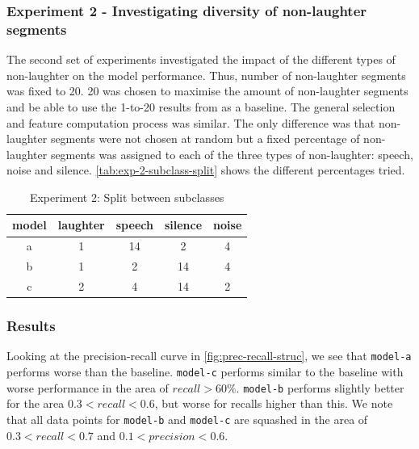 \documentclass[bsc,frontabs,parskip,deptreport]{infthesis}
\begin{document}
\subsubsection{Experiment 2 - Investigating diversity of non-laughter segments}
The second set of experiments investigated the impact of the different types of non-laughter on the model performance. 
Thus, number of non-laughter segments was fixed to 20. 20 was chosen to maximise the amount of non-laughter segments and be able to use the 1-to-20 results from  as a baseline.
The general selection and feature computation process was similar.
The only difference was that non-laughter segments were not chosen at random but a fixed percentage of non-laughter segments was assigned to each of the three types of non-laughter: speech, noise and silence.
\autoref{tab:exp-2-subclass-split} shows the different percentages tried.

\begin{table}[]
    \centering
    \begin{tabular}{|c|c|c|c|c|}
        \hline
        model & laughter & speech & silence & noise \\
        \hline
        a & 1 & 14 & 2 & 4 \\
        b & 1 &  2 & 14 & 4\\
        c & 2 & 4  & 14 & 2\\ 
        \hline
    \end{tabular}
    \caption{Experiment 2: Split between subclasses}
    \label{tab:exp-2-subclass-split}
\end{table}

\subsubsection{Results}
Looking at the precision-recall curve in \autoref{fig:prec-recall-struc}, we see that \texttt{model-a} performs worse than the baseline. \texttt{model-c} performs similar to the baseline with worse performance in the area of $recall > 60\%$. \texttt{model-b} performs slightly better for the area $0.3<recall<0.6$, but worse for recalls higher than this.
We note that all data points for \texttt{model-b} and \texttt{model-c} are squashed in the area of $0.3 < recall < 0.7$ and $0.1 < precision < 0.6$.
\end{document}
